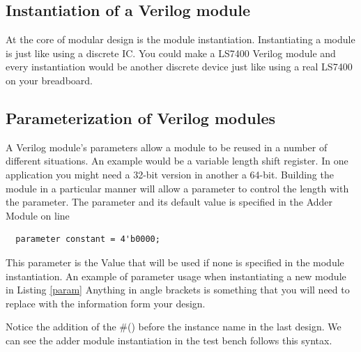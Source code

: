     \subsection{Instantiation of a Verilog module}
      At the core of modular design is the module instantiation. Instantiating a module is just like using a discrete IC. You could make a LS7400 Verilog module and every instantiation would be another discrete device just like using a real LS7400 on your breadboard.
      
    
    \subsection{Parameterization of Verilog modules}
      A Verilog module's parameters allow a module to be reused in a number of different situations. An example would be a variable length shift register. In one application you might need a 32-bit version in another a 64-bit. Building the module in a particular manner will allow a parameter to control the length with the parameter. The parameter and its default value is specified in the Adder Module on line
      \begin{lstlisting}
  parameter constant = 4'b0000;
      \end{lstlisting}
      This parameter is the Value that will be used if none is specified in the module instantiation. An example of parameter usage when instantiating a new module in Listing \ref{param} Anything in angle brackets is something that you will need to replace with the information form your design.
      

      Notice the addition of the \#() before the instance name in the last design. We can see the adder module instantiation in the test bench follows this syntax.
      

